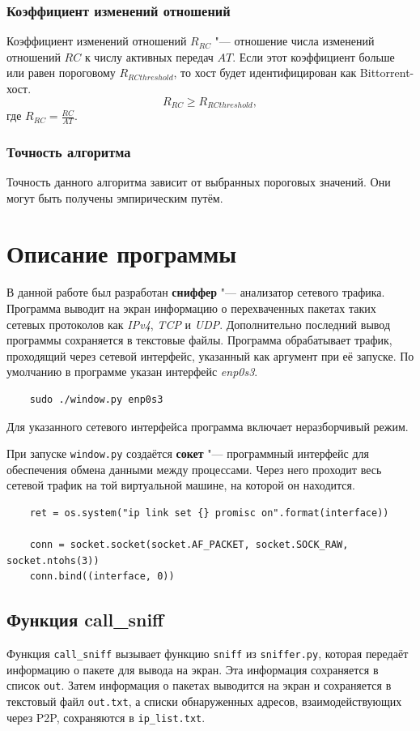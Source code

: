 \documentclass[bachelor, och, coursework]{SCWorks}
\begin{document}
\subsubsection{Коэффициент изменений отношений}
Коэффициент изменений отношений $R_{RC}$ "--- отношение числа изменений отношений $RC$ к числу активных передач $AT$.
Если этот коэффициент больше или равен пороговому $R_{RCthreshold}$, то хост будет идентифицирован как Bittorrent-хост.
\[ R_{RC} \geq R_{RCthreshold}, \]
где $R_{RC} = \frac{RC}{AT}$.

\subsubsection{Точность алгоритма}
Точность данного алгоритма зависит от выбранных пороговых значений. Они могут быть получены эмпирическим путём.

\section{Описание программы}
В данной работе был разработан \textbf{сниффер} "--- анализатор сетевого трафика. 
Программа выводит на экран информацию о перехваченных пакетах таких сетевых протоколов как \textit{IPv4}, \textit{TCP} и \textit{UDP}. 
Дополнительно последний вывод программы сохраняется в текстовые файлы. Программа обрабатывает трафик, проходящий через сетевой интерфейс, указанный как аргумент при её запуске. По умолчанию в программе указан интерфейс \textit{enp0s3}.

\begin{verbatim}
    sudo ./window.py enp0s3
\end{verbatim}

Для указанного сетевого интерфейса программа включает неразборчивый режим.

При запуске \texttt{window.py} создаётся \textbf{сокет} "--- программный интерфейс для обеспечения обмена данными между процессами. Через него проходит весь сетевой трафик на той виртуальной машине, на которой он находится. 

\begin{verbatim}
    ret = os.system("ip link set {} promisc on".format(interface))

    conn = socket.socket(socket.AF_PACKET, socket.SOCK_RAW, socket.ntohs(3))
    conn.bind((interface, 0))
\end{verbatim}

\subsection{Функция call_sniff}
Функция \texttt{call_sniff} вызывает функцию \texttt{sniff} из \texttt{sniffer.py}, которая передаёт информацию о пакете для вывода на экран. Эта информация сохраняется в список \texttt{out}. Затем информация о пакетах выводится на экран и сохраняется в текстовый файл \texttt{out.txt}, а списки обнаруженных адресов, взаимодействующих через P2P, сохраняются в \texttt{ip_list.txt}.
\end{document}
